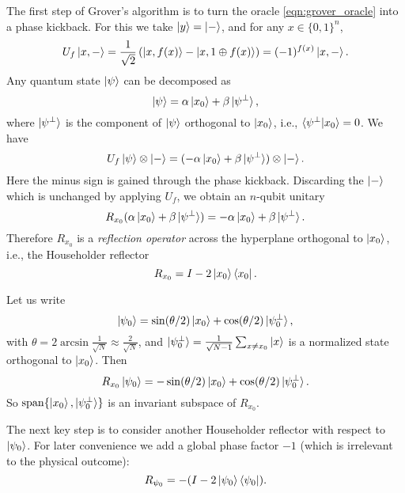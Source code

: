 The first step of Grover's algorithm is to turn the oracle \eqref{eqn:grover_oracle} into a phase kickback. For this we take $\ket{y}=\ket{-}$, and for any $x\in\{0,1\}^n$,
\begin{equation}
U_f\ket{x,-}=\frac{1}{\sqrt{2}}\left(\ket{x,f(x)}-\ket{x,1\oplus f(x)}\right)=(-1)^{f(x)} \ket{x,-}.
\end{equation}
Any quantum state $\ket{\psi}$ can be decomposed as
\begin{equation}
\ket{\psi}=\alpha \ket{x_0}+\beta\ket{\psi^{\perp}},
\end{equation}
where $\ket{\psi^{\perp}}$ is the component of $\ket{\psi}$ orthogonal to $\ket{x_0}$, i.e., $\braket{\psi^{\perp}|x_0}=0$. 
We have
\begin{equation}
U_f\ket{\psi}\otimes\ket{-}=(-\alpha\ket{x_0}+\beta \ket{\psi^{\perp}})\otimes\ket{-}.
\end{equation}
Here the minus sign is gained through the phase kickback.
Discarding the $\ket{-}$ which is unchanged by applying $U_f$, we obtain an $n$-qubit unitary
\begin{equation}
R_{x_0} (\alpha \ket{x_0}+\beta\ket{\psi^{\perp}})=-\alpha\ket{x_0}+\beta \ket{\psi^{\perp}}.
\end{equation}
Therefore $R_{x_0}$ is a \emph{reflection operator} across the hyperplane orthogonal to $\ket{x_0}$, i.e., the Householder reflector 
\begin{equation}
R_{x_0}=I-2\ket{x_0}\bra{x_0}.
\end{equation}

Let us write
\begin{equation}
\ket{\psi_0}=\sin (\theta/2)\ket{x_0}+\cos(\theta/2)\ket{\psi_0^{\perp}},
\end{equation}
with $\theta=2\arcsin \frac{1}{\sqrt{N}}\approx \frac{2}{\sqrt{N}}$,
and $\ket{\psi_0^{\perp}}=\frac{1}{\sqrt{N-1}}\sum_{x\ne x_0} \ket{x}$ is a normalized state orthogonal to $\ket{x_0}$. 
Then
\begin{equation}
R_{x_0}\ket{\psi_0}=-\sin(\theta/2)\ket{x_0}+\cos(\theta/2)\ket{\psi_0^{\perp}}.
\end{equation}
So $\operatorname{span}\{\ket{x_0},\ket{\psi_0^{\perp}}\}$ is an invariant subspace of $R_{x_0}$. 

The next key step is to consider another Householder reflector with respect to $\ket{\psi_0}$. For later convenience we add a global phase factor $-1$ (which is irrelevant to the physical outcome):
\begin{equation}
R_{\psi_0}=-(I-2\ket{\psi_0}\bra{\psi_0}).
\end{equation}

